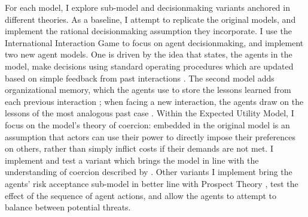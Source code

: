 For each model, I explore sub-model and decisionmaking variants anchored in different theories. As a baseline, I attempt to replicate the original models, and implement the  rational decisionmaking assumption they incorporate. I use the International Interaction Game to focus on agent decisionmaking, and implement two new agent models. One is driven by the idea that states, the agents in the model, make decisions using standard operating procedures \citep{allison_1999,levy_1986} which are updated based on simple feedback from past interactions \citep{steinbruner_1976}. The second model adds organizational memory, which the agents use to store the lessons learned from each previous interaction \citep{march_1993}; when facing a new interaction, the agents draw on the lessons of the most analogous past case \citep{khong_1992,schuman_1992}. Within the Expected Utility Model, I focus on the model's theory of coercion: embedded in the original model is an assumption that actors can use their power to directly impose their preferences on others, rather than simply inflict costs if their demands are not met. I implement and test a variant which brings the model in line with the understanding of coercion described by \citet{schelling_1966}. Other variants I implement bring the agents' risk acceptance sub-model in better line with Prospect Theory \citep{kahneman_1984,mcdermott_2001}, test the effect of the sequence of agent actions, and allow the agents to attempt to balance between potential threats.

